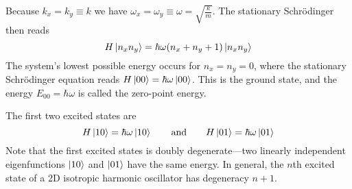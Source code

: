 \documentclass[11pt, a4paper]{article}
\newcommand{\eqtext}[1]{\qquad \text{#1} \qquad}
\newcommand{\Schro}{Schr\"{o}dinger\xspace}
\begin{document}
\begin{itemize}
	Because $ k_{x} = k_{y} \equiv k $ we have $ \omega_{x} = \omega_{y} \equiv \omega = \sqrt{\frac{k}{m}}$. The stationary \Schro then reads
	\begin{equation*}
		H\ket{n_{x}n_{y}} = \hbar \omega (n_{x} + n_{y} + 1)\ket{n_{x}n_{y}}
	\end{equation*}
	The system's lowest possible energy occurs for $ n_{x} = n_{y} = 0 $, where the stationary \Schro equation reads $ H\ket{00} = \hbar \omega \ket{00} $. This is the ground state, and the energy $ E_{00} = \hbar \omega $ is called the zero-point energy. 
	
	The first two excited states are
	\begin{equation*}
		H\ket{10} = \hbar \omega \ket{10} \eqtext{and} H\ket{01} = \hbar \omega \ket{01}
	\end{equation*}
	Note that the first excited states is doubly degenerate---two linearly independent eigenfunctions $ \ket{10} $ and $ \ket{01} $ have the same energy. In general, the $ n $th excited state of a 2D isotropic harmonic oscillator has degeneracy $ n +1 $. 
\end{itemize}
\end{document}
